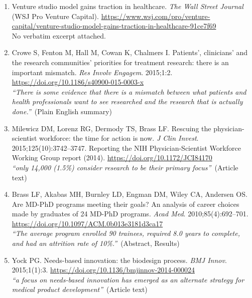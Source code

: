 \documentclass[12pt]{article}
\begin{document}
{\begin{enumerate}[leftmargin=1.8em,itemsep=5pt,topsep=0pt,label=\arabic*.]
\item \hypertarget{ref-wsj}{}Venture studio model gains traction in healthcare. \textit{The Wall Street Journal} (WSJ Pro Venture Capital). \url{https://www.wsj.com/pro/venture-capital/venture-studio-model-gains-traction-in-healthcare-91ce7f69}\\[1pt]{\color{quote}\footnotesize No verbatim excerpt attached.}
\item \hypertarget{ref-crowe2015}{}Crowe S, Fenton M, Hall M, Cowan K, Chalmers I. Patients', clinicians' and the research communities' priorities for treatment research: there is an important mismatch. \textit{Res Involv Engagem}. 2015;1:2. \url{https://doi.org/10.1186/s40900-015-0003-x}\\[1pt]{\color{quote}\itshape ``There is some evidence that there is a mismatch between what patients and health professionals want to see researched and the research that is actually done.''}~{\color{quote}\footnotesize(Plain English summary)}
\item \hypertarget{ref-milewicz2015}{}Milewicz DM, Lorenz RG, Dermody TS, Brass LF. Rescuing the physician-scientist workforce: the time for action is now. \textit{J Clin Invest}. 2015;125(10):3742--3747. Reporting the NIH Physician-Scientist Workforce Working Group report (2014). \url{https://doi.org/10.1172/JCI84170}\\[1pt]{\color{quote}\itshape ``only 14,000 (1.5\%) consider research to be their primary focus''}~{\color{quote}\footnotesize(Article text)}
\item \hypertarget{ref-brass2010}{}Brass LF, Akabas MH, Burnley LD, Engman DM, Wiley CA, Andersen OS. Are MD-PhD programs meeting their goals? An analysis of career choices made by graduates of 24 MD-PhD programs. \textit{Acad Med}. 2010;85(4):692--701. \url{https://doi.org/10.1097/ACM.0b013e3181d3ca17}\\[1pt]{\color{quote}\itshape ``The average program enrolled 90 trainees, required 8.0 years to complete, and had an attrition rate of 10\%.''}~{\color{quote}\footnotesize(Abstract, Results)}
\item \hypertarget{ref-yock2015}{}Yock PG. Needs-based innovation: the biodesign process. \textit{BMJ Innov}. 2015;1(1):3. \url{https://doi.org/10.1136/bmjinnov-2014-000024}\\[1pt]{\color{quote}\itshape ``a focus on needs-based innovation has emerged as an alternate strategy for medical product development''}~{\color{quote}\footnotesize(Article text)}
\end{enumerate}
}
\end{document}
